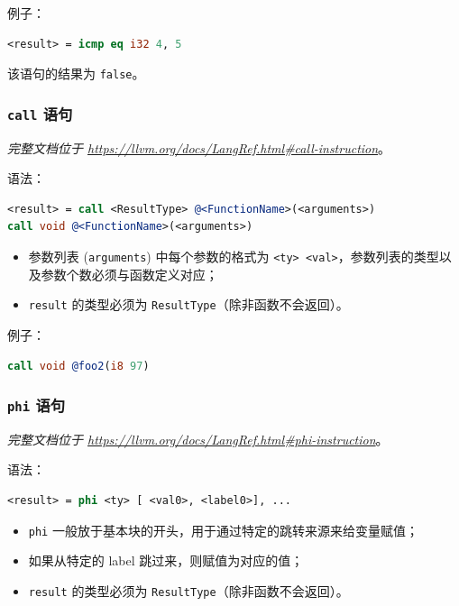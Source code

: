 例子：
\begin{lstlisting}[language=llvm]
<result> = icmp eq i32 4, 5
\end{lstlisting}

该语句的结果为 \texttt{false}。

\subsubsection{\texttt{call} 语句}\label{LLVM-call-statements}

\textit{完整文档位于 \url{https://llvm.org/docs/LangRef.html\#call-instruction}}。

语法：
\begin{lstlisting}[language=llvm]
<result> = call <ResultType> @<FunctionName>(<arguments>)
call void @<FunctionName>(<arguments>)
\end{lstlisting}

\begin{itemize}
  \item 参数列表 (\texttt{arguments}) 中每个参数的格式为
    \texttt{<ty> <val>}，参数列表的类型以及参数个数必须与函数定义对应；
  \item \texttt{result} 的类型必须为 \texttt{ResultType}（除非函数不会返回）。
\end{itemize}

例子：
\begin{lstlisting}[language=llvm]
%result = call i32 @foo1(i32 %arg1)
call void @foo2(i8 97)
\end{lstlisting}

\subsubsection{\texttt{phi} 语句}\label{LLVM-phi-statements}

\textit{完整文档位于 \url{https://llvm.org/docs/LangRef.html\#phi-instruction}}。

语法：
\begin{lstlisting}[language=llvm]
<result> = phi <ty> [ <val0>, <label0>], ...
\end{lstlisting}

\begin{itemize}
  \item \texttt{phi} 一般放于基本块的开头，用于通过特定的跳转来源来给变量赋值；
  \item 如果从特定的 label 跳过来，则赋值为对应的值；
  \item \texttt{result} 的类型必须为 \texttt{ResultType}（除非函数不会返回）。
\end{itemize}

